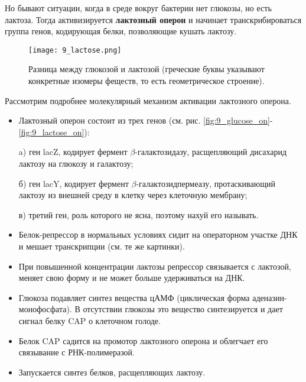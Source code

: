 Но бывают ситуации, когда в среде вокруг бактерии нет глюкозы, но есть лактоза. Тогда активизируется \textbf{лактозный оперон} и начинает транскрибироваться группа генов, кодирующая белки, позволяющие кушать лактозу. 

\begin{figure}[H]
    \centering
    \texttt{[image: 9\_lactose.png]}
    \caption{Разница между глюкозой и лактозой (греческие буквы указывают конкретные изомеры феществ, то есть геометрическое строение).}
    \label{fig:9_lactose}
\end{figure}

Рассмотрим подробнее молекулярный механизм активации лактозного оперона. 

\begin{itemize}
    \item Лактозный оперон состоит из трех генов (см. рис. \ref{fig:9_glucose_on}-\ref{fig:9_lactose_on}): 
    
    a) ген lacZ, кодирует фермент \(\beta\)-галактозидазу, расщепляющий дисахарид лактозу на глюкозу и галактозу;
    
    б) ген lacY, кодирует фермент  \(\beta\)-галактозидпермеазу, протаскивающий лактозу из внешней среду в клетку через клеточную мембрану;
    
    в) третий ген, роль которого не ясна, поэтому нахуй его называть.
    
    \item Белок-репрессор в нормальных условиях сидит на операторном участке ДНК и мешает транскрипции (см. те же картинки).
    
    \item При повышенной концентрации лактозы репрессор связывается с лактозой, меняет свою форму и не может больше удерживаться на ДНК.
    
    \item Глюкоза подавляет синтез вещества цАМФ (циклическая форма аденазин-монофосфата). В отсутствии глюкозы это вещество синтезируется и дает сигнал белку CAP о клеточном голоде.
    
    \item Белок CAP садится на промотор лактозного оперона и облегчает его связывание с РНК-полимеразой.
    
    \item Запускается синтез белков, расщепляющих лактозу.
    
    
\end{itemize}

